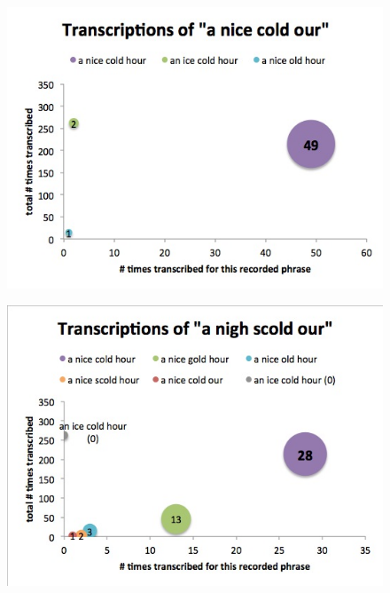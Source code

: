 \begin{figure}[h]
\begin{center}
\includegraphics[width=\piechartwidth]{bubbleChartTranscriptionFrequency_aNiceColdOur.jpg}
\captionfonts
\caption[Most common transcriptions for the recorded phrase "aNiceColdOur"]{}
\label{bubbleChart:aNiceColdOur}
\end{center}
\end{figure}



\begin{figure}[h]
\begin{center}
\includegraphics[width=\piechartwidth]{bubbleChartTranscriptionFrequency_aNighScoldOur.jpg}
\captionfonts
\caption[Most common transcriptions for the recorded phrase "aNighScoldOur"]{}
\label{bubbleChart:aNighScoldOur}
\end{center}
\end{figure}

